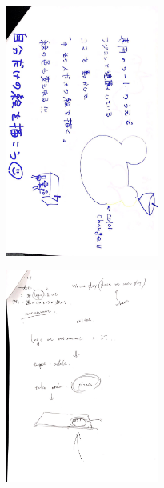 \documentclass{funthesis}
\begin{document}
\begin{figure}[H]
 \begin{minipage}{0.47\hsize}
 \begin{center}
\includegraphics[width=50mm]{figures/group3.jpg}
 \end{center}
 \label{fig:seven}
 \end{minipage}
 \begin{minipage}{0.47\hsize}
 \begin{center}
 \includegraphics[width=50mm]{figures/group4.jpg}
 \end{center}
 \label{fig:eight}
 \end{minipage}
\end{figure}
\end{document}

